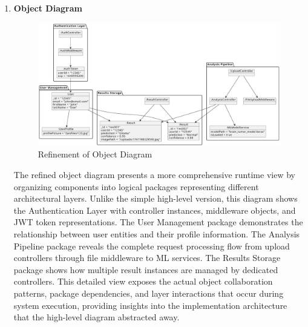 \begin{enumerate}[label=\roman*.]
          \newpage
    \item \textbf{Object Diagram}
          \begin{center}
              \begin{figure}[H]
                  \centering
                  \includegraphics[width=1\linewidth]{Images/Refined/obj.pdf}
                  \caption{Refinement of Object Diagram}
                  \label{fig:RefinementofObjectDiagram}
              \end{figure}
          \end{center}
          The refined object diagram presents a more comprehensive runtime view by organizing components into logical packages representing different architectural layers. Unlike the simple high-level version, this diagram shows the Authentication Layer with controller instances, middleware objects, and JWT token representations. The User Management package demonstrates the relationship between user entities and their profile information. The Analysis Pipeline package reveals the complete request processing flow from upload controllers through file middleware to ML services. The Results Storage package shows how multiple result instances are managed by dedicated controllers. This detailed view exposes the actual object collaboration patterns, package dependencies, and layer interactions that occur during system execution, providing insights into the implementation architecture that the high-level diagram abstracted away.


\end{enumerate}
